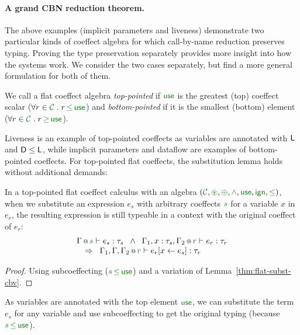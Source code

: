 \paragraph{A grand CBN reduction theorem.}
The above examples (implicit parameters and liveness) demonstrate two particular kinds of coeffect
algebra for which call-by-name reduction preserves typing. Proving the type preservation separately
provides more insight into how the systems work. We consider the two cases separately, but find a
more general formulation for both of them.

\begin{definition}
We call a flat coeffect algebra \emph{top-pointed} if $\cunit$ is the greatest (top) coeffect scalar
($\forall r \in \C \;.\; r \,\cleq\, \cunit $) and \emph{bottom-pointed} if it is the smallest (bottom)
element ($\forall r \in \C \;.\; r \,\cgeq\, \cunit $).
\end{definition}

\noindent
Liveness is an example of top-pointed coeffects as variables are annotated with
$\textnormal{\sffamily L}$ and $\textnormal{\sffamily D} \leq \textnormal{\sffamily L}$, while implicit parameters and dataflow are examples
of bottom-pointed coeffects. For top-pointed flat coeffects, the substitution lemma holds without
additional demands:

\begin{lemma}
\label{thm:cbn-substitution-top}
In a top-pointed flat coeffect calculus with an algebra $(\C, \cseq, \cpar, \czip, \cunit, \czero, \cleq)$,
when we substitute  an expression $e_s$ with arbitrary coeffects $\cclrd{s}$ for a variable $x$ in $e_r$,
the resulting expression is still typeable in a context with the original coeffect of $e_r$:
%
\begin{equation*}
\begin{array}{l}
 \coctx{\Gamma}{\cclrd{s}} \vdash e_s : \tau_s \;\; \wedge \;\;
   \coctx{\Gamma_1,  x : \tau_s, \Gamma_2}{ \cclrd{r}  } \vdash e_r : \tau_r\\
 \quad \Rightarrow \;\; \coctx{\Gamma_1,\Gamma,\Gamma_2}{ \cclrd{r} } \vdash \subst{e_r}{x}{e_s} : \tau_r
\end{array}
\end{equation*}
\end{lemma}

\begin{proof}
Using subcoeffecting ($\cclrd{s} \,\cleq\, \cunit$) and a variation of Lemma~\ref{thm:flat-subst-cbv}.
\end{proof}
%
\noindent
As variables are annotated with the top element $\cunit$, we can substitute the term $e_s$
for any variable and use subcoeffecting to get the original typing (because
$\cclrd{s} \,\cleq\, \cunit$).

